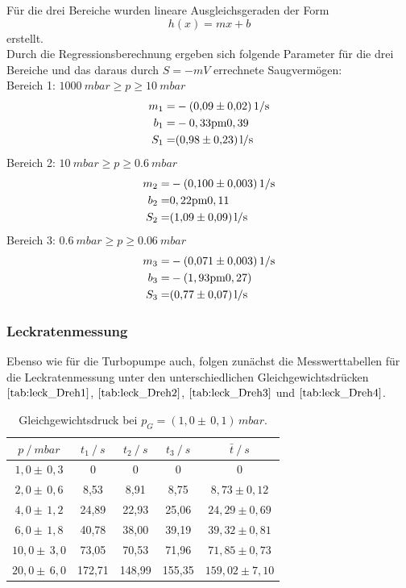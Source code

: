 Für die drei Bereiche wurden lineare Ausgleichsgeraden der Form
\begin{equation}
	h(x)=mx+b
\end{equation}
erstellt.\\
Durch die Regressionsberechnung ergeben sich folgende Parameter für die drei Bereiche und das daraus durch $S=-mV$ errechnete Saugvermögen:\\
Bereich 1: $\SI{1000}{mbar} \geq p \geq \SI{10}{mbar}$\\
\begin{align*}
	m_1=& -\SI{0,09 \pm 0,02}{1/s}\\
	b_1=& -\si{0,33 \pm 0,39}\\
	S_1=& \SI{0,98 \pm 0,23}{l/s}
\end{align*}
Bereich 2: $\SI{10}{mbar} \geq p \geq \SI{0,6}{mbar}$\\
\begin{align*}
	m_2=& -\SI{0,100 \pm 0,003}{1/s}\\
	b_2=& \si{0,22 \pm 0,11}\\
	S_2=& \SI{1,09 \pm 0,09}{l/s}
\end{align*}
Bereich 3: $\SI{0,6}{mbar} \geq p \geq \SI{0,06}{mbar}$\\
\begin{align*}
	m_3=& -\SI{0,071 \pm 0,003}{1/s}\\
	b_3=& -\si{(1,93 \pm 0,27)}\\
	S_3=& \SI{0,77 \pm 0,07}{l/s}
\end{align*}

\subsubsection{Leckratenmessung}
Ebenso wie für die Turbopumpe auch, folgen zunächst die Messwerttabellen für die Leckratenmessung
unter den unterschiedlichen Gleichgewichtsdrücken $\ref{tab:leck_Dreh1}$, $\ref{tab:leck_Dreh2}$, $\ref{tab:leck_Dreh3}$ und $\ref{tab:leck_Dreh4}$.
\begin{table}[H]
\centering
\begin{tabular}{c|c|c|c|c}
	{$p \:/\: \si{mbar}$} & {$t_1 \:/\: \si{s} $} & {$t_2 \:/\: \si{s} $} & {$t_3 \:/\: \si{s} $} & {$\bar{t} \:/\: \si{s}$}\\
\midrule
$1,0 \pm \, 0,3$ &0 &0 &0 &0\\
$2,0 \pm \, 0,6$ &   8,53 &  8,91 &  8,75 & $8,73 \pm 0,12$\\
$4,0 \pm \, 1,2$ &   24,89  &  22,93 &  25,06 & $24,29 \pm 0,69 $\\
$6,0 \pm \, 1,8$ &   40,78 &  38,00 &  39,19 & $39,32 \pm 0,81 $\\
$10,0 \pm \, 3,0$ &   73,05 &  70,53 &  71,96 & $71,85 \pm 0,73 $\\
$20,0 \pm \, 6,0$ &   172,71 &  148,99 &  155,35 & $159,02 \pm 7,10 $\\
\end{tabular}
\caption{Gleichgewichtsdruck bei $p_G=(1,0 \pm \, 0,1)  \, \si{mbar}$.}
\label{tab:leck_Dreh1}
\end{table}

